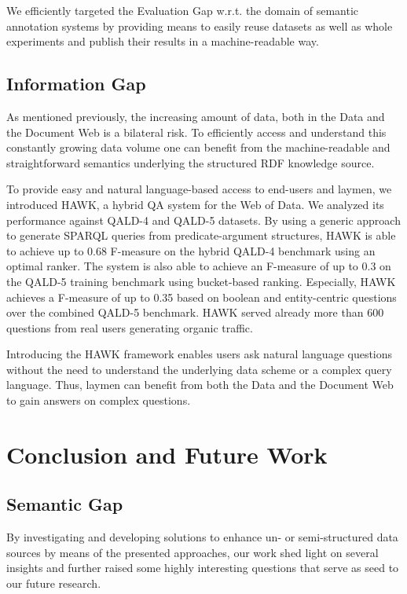 We efficiently targeted the Evaluation Gap w.r.t. the domain of semantic annotation systems by providing means to easily reuse datasets as well as whole experiments and publish their results in a machine-readable way.

\subsection*{Information Gap}

As mentioned previously, the increasing amount of data, both in the Data and the Document Web is a bilateral risk. 
To efficiently access and understand this constantly growing data volume one can benefit from the machine-readable and straightforward semantics underlying the structured RDF knowledge source. 

To provide easy and natural language-based access to end-users and laymen, we introduced HAWK, a hybrid \ac{QA} system for the Web of Data.
We analyzed its performance against \ac{QALD}-4 and \ac{QALD}-5 datasets.
By using a generic approach to generate SPARQL queries from predicate-argument structures,   HAWK is able to achieve up to 0.68 F-measure on the hybrid \ac{QALD}-4 benchmark using an optimal ranker.
The system is also able to achieve an F-measure of up to 0.3 on the \ac{QALD}-5 training benchmark using bucket-based ranking.
Especially, HAWK achieves a F-measure of up to 0.35 based on boolean and entity-centric questions over the combined \ac{QALD}-5 benchmark.
HAWK served already more than 600 questions from real users generating organic traffic.

Introducing the HAWK framework enables users ask natural language questions without the need to understand the underlying data scheme or a complex query language. 
Thus, laymen can benefit from both the Data and the Document Web to gain answers on complex questions. 



\section{Conclusion and Future Work}
\subsection*{Semantic Gap}

By investigating and developing solutions to enhance un- or semi-structured data sources by means of the presented approaches, our work shed light on several insights and further raised some highly interesting questions that serve as seed to our future research. 


